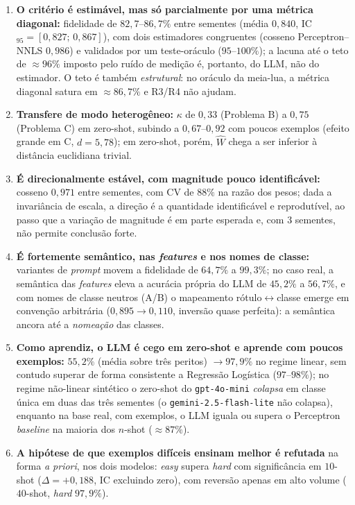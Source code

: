 \documentclass[12pt,a4paper]{article}
\newcommand{\West}{\ensuremath{\hat{W}}}   %
\begin{document}
\begin{enumerate}
  \item \textbf{O critério é estimável, mas só parcialmente por uma métrica diagonal:}
    fidelidade de $82{,}7$–$86{,}7\%$ entre sementes (média $0{,}840$,
    IC$_{95}=[0{,}827;\,0{,}867]$), com
    dois estimadores congruentes (cosseno Perceptron--NNLS $0{,}986$) e validados por um
    teste-oráculo ($95$–$100\%$); a lacuna até o teto de $\approx 96\%$ imposto pelo ruído
    de medição é, portanto, do LLM, não do estimador. O teto é também \emph{estrutural}: no
    oráculo da meia-lua, a métrica diagonal satura em $\approx 86{,}7\%$ e R3/R4 não ajudam.
  \item \textbf{Transfere de modo heterogêneo:} $\kappa$ de $0{,}33$ (Problema B) a $0{,}75$
    (Problema C) em zero-shot, subindo a $0{,}67$–$0{,}92$ com poucos exemplos (efeito
    grande em C, $d=5{,}78$); em zero-shot, porém, \West{} chega a ser inferior à distância
    euclidiana trivial.
  \item \textbf{É direcionalmente estável, com magnitude pouco identificável:} cosseno
    $0{,}971$ entre sementes, com CV de $88\%$ na razão dos pesos; dada a invariância de
    escala, a direção é a quantidade identificável e reprodutível, ao passo que a variação de
    magnitude é em parte esperada e, com $3$ sementes, não permite conclusão forte.
  \item \textbf{É fortemente semântico, nas \emph{features} e nos nomes de classe:}
    variantes de \emph{prompt} movem a fidelidade de $64{,}7\%$ a $99{,}3\%$; no caso real,
    a semântica das \emph{features} eleva a acurácia própria do LLM de $45{,}2\%$ a
    $56{,}7\%$, e com nomes de classe neutros (A/B) o mapeamento rótulo$\leftrightarrow$classe
    emerge em convenção arbitrária ($0{,}895 \to 0{,}110$, inversão quase perfeita): a
    semântica ancora até a \emph{nomeação} das classes.
  \item \textbf{Como aprendiz, o LLM é cego em zero-shot e aprende com poucos exemplos:}
    $55{,}2\%$ (média sobre três peritos) $\to 97{,}9\%$ no regime linear, sem contudo
    superar de forma consistente a Regressão Logística
    ($97$–$98\%$); no regime não-linear sintético o zero-shot do \texttt{gpt-4o-mini}
    \emph{colapsa} em classe única em duas das três sementes (o
    \texttt{gemini-2.5-flash-lite} não colapsa), enquanto na base real, com exemplos, o LLM
    iguala ou supera o Perceptron \emph{baseline} na maioria dos $n$-shot ($\approx 87\%$).
  \item \textbf{A hipótese de que exemplos difíceis ensinam melhor é refutada} na forma
    \emph{a priori}, nos dois modelos: \emph{easy} supera \emph{hard} com significância em
    $10$-shot ($\Delta = +0{,}188$, IC excluindo zero), com reversão apenas em alto volume
    ($40$-shot, \emph{hard} $97{,}9\%$).
\end{enumerate}
\end{document}
